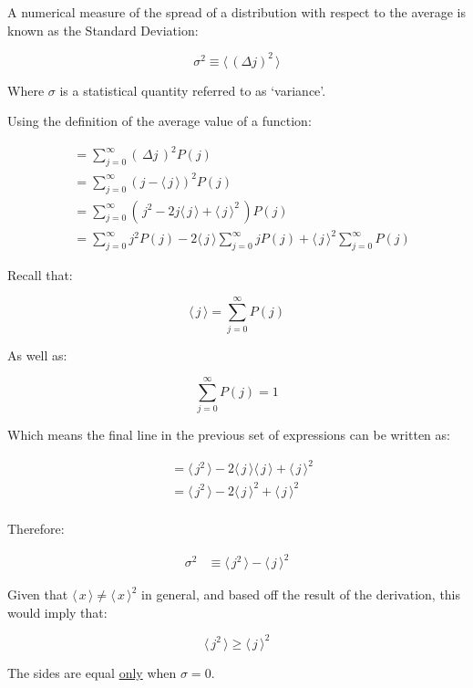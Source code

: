 A numerical measure of the spread of a distribution with respect to the average is known as the Standard Deviation:

\[
    \sigma^{2} \equiv \langle \, (\Delta j)^{2} \, \rangle
\]

Where $\sigma$ is a statistical quantity referred to as `variance'.

Using the definition of the average value of a function:

\begin{align*}
    &= \sum_{j=0}^{\infty} ( \, \Delta j \,)^{2} P(j) \\[1.5ex]
    &= \sum_{j=0}^{\infty} (j - \langle \, j \, \rangle)^{2} P(j) \\[1.5ex]
    &= \sum_{j=0}^{\infty} (\,j^{2} - 2j \langle \, j \, \rangle + \langle \, j \, \rangle^{2}\,) P(j) \\[1.5ex]
    &= \sum_{j=0}^{\infty} j^2 P(j) - 2 \langle \, j \, \rangle \sum_{j=0}^{\infty} jP(j)
       + \langle \, j \, \rangle^{2} \sum_{j=0}^{\infty} P(j)
\end{align*}

Recall that:

\[
    \langle \, j \, \rangle = \sum_{j=0}^{\infty} P(j)
\]

As well as:

\[
    \sum_{j=0}^{\infty} P(j) = 1
\]

Which means the final line in the previous set of expressions can be written as:

\begin{align*}
    &= \langle \, j^{2} \, \rangle - 2 \langle \, j \, \rangle \langle \, j \, \rangle + \langle \, j \, \rangle^{2}
    \\[1.5ex]
    &= \langle \, j^{2} \, \rangle - 2 \langle \, j \, \rangle^{2} + \langle \, j \, \rangle^{2} \\[1.5ex]
\end{align*}

\newpage

Therefore:

\begin{align*}
    \sigma^{2} &\equiv \boxed{\langle \, j^{2} \, \rangle - \langle \, j \, \rangle^{2}}
\end{align*}

\bigskip

Given that $\langle \, x \, \rangle \neq \langle \, x \, \rangle^{2}$ in general, and based off the result of the
derivation, this would imply that:

\[
    \langle \, j^{2} \, \rangle \geq \langle \, j \, \rangle^{2}
\]

The sides are equal \underline{only} when $\sigma = 0$.
